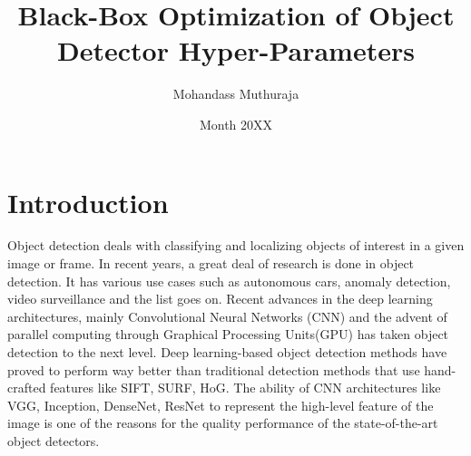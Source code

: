 \documentclass[thesis]{mas_proposal}
\title{Black-Box Optimization of Object Detector Hyper-Parameters}
\author{Mohandass Muthuraja}
\date{Month 20XX}
\begin{document}
\maketitle

\pagestyle{plain}

\section{Introduction}
Object detection deals with classifying and localizing objects of interest in a given image or frame. In recent years, a great deal of research is done in object detection. It has various use cases such as autonomous cars, anomaly detection, video surveillance and the list goes on. Recent advances in the deep learning architectures, mainly Convolutional Neural Networks (CNN) and the advent of parallel computing through Graphical Processing Units(GPU) has taken object detection to the next level. Deep learning-based object detection methods have proved to perform way better than traditional detection methods that use hand-crafted features like SIFT, SURF, HoG. The ability of CNN architectures like VGG, Inception, DenseNet, ResNet to represent the high-level feature of the image is one of the reasons for the quality performance of the state-of-the-art object detectors. 
\end{document}
